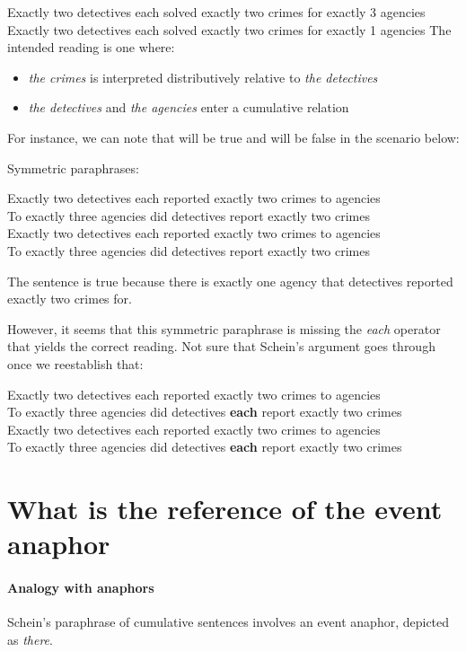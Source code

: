 \documentclass[english]{article}
\begin{document}
\pex
\a 
Exactly two detectives each solved exactly two crimes for exactly 3 agencies
\a 
Exactly two detectives each solved exactly two crimes for exactly 1 agencies
\xe
%
The intended reading is one where:

\begin{itemize}
 	\item \emph{the crimes} is interpreted distributively relative to \emph{the detectives}
 	\item \emph{the detectives} and \emph{the agencies} enter a cumulative relation
 \end{itemize} 
%
For instance, we can note that \clastxa will be true and \clastxb will be false in the scenario below:

\ex

\xe
%
Symmetric paraphrases:

\pex
\a 
Exactly two detectives each reported exactly two crimes to agencies\\
To exactly three agencies did detectives report exactly two crimes\\
\a 
Exactly two detectives each reported exactly two crimes to agencies\\
To exactly three agencies did detectives report exactly two crimes\\
\xe
%
\begin{squ}
The sentence is true because there is exactly one agency that detectives reported exactly two crimes for.
\end{squ}
%
However, it seems that this symmetric paraphrase is missing the \emph{each} operator that yields the correct reading. Not sure that Schein's argument goes through once we reestablish that:

\pex
\a 
Exactly two detectives each reported exactly two crimes to agencies\\
To exactly three agencies did detectives \textbf{each} report exactly two crimes\\
\a 
Exactly two detectives each reported exactly two crimes to agencies\\
To exactly three agencies did detectives \textbf{each} report exactly two crimes\\
\xe
%

\section{What is the reference of the event anaphor}

\paragraph{Analogy with anaphors}
Schein's paraphrase of cumulative sentences involves an event anaphor, depicted as \emph{there}. 
\end{document}
